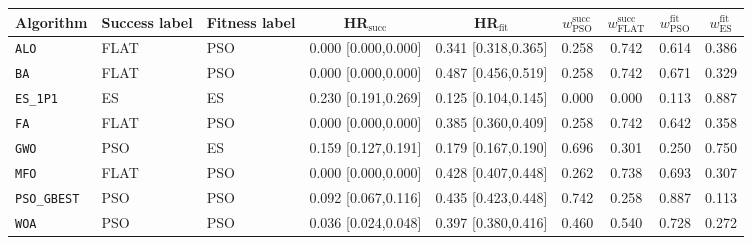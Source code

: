 \begin{tabular}{l ll cc cccc}
\hline
Algorithm & Success label & Fitness label & HR$_{\text{succ}}$ & HR$_{\text{fit}}$ & $w^{\text{succ}}_{\text{PSO}}$ & $w^{\text{succ}}_{\text{FLAT}}$ & $w^{\text{fit}}_{\text{PSO}}$ & $w^{\text{fit}}_{\text{ES}}$ \\
\hline
\texttt{ALO} & FLAT & PSO & 0.000 [0.000,0.000] & 0.341 [0.318,0.365] & 0.258 & 0.742 & 0.614 & 0.386 \\
\texttt{BA} & FLAT & PSO & 0.000 [0.000,0.000] & 0.487 [0.456,0.519] & 0.258 & 0.742 & 0.671 & 0.329 \\
\texttt{ES_1P1} & ES & ES & 0.230 [0.191,0.269] & 0.125 [0.104,0.145] & 0.000 & 0.000 & 0.113 & 0.887 \\
\texttt{FA} & FLAT & PSO & 0.000 [0.000,0.000] & 0.385 [0.360,0.409] & 0.258 & 0.742 & 0.642 & 0.358 \\
\texttt{GWO} & PSO & ES & 0.159 [0.127,0.191] & 0.179 [0.167,0.190] & 0.696 & 0.301 & 0.250 & 0.750 \\
\texttt{MFO} & FLAT & PSO & 0.000 [0.000,0.000] & 0.428 [0.407,0.448] & 0.262 & 0.738 & 0.693 & 0.307 \\
\texttt{PSO_GBEST} & PSO & PSO & 0.092 [0.067,0.116] & 0.435 [0.423,0.448] & 0.742 & 0.258 & 0.887 & 0.113 \\
\texttt{WOA} & PSO & PSO & 0.036 [0.024,0.048] & 0.397 [0.380,0.416] & 0.460 & 0.540 & 0.728 & 0.272 \\
\hline
\end{tabular}
